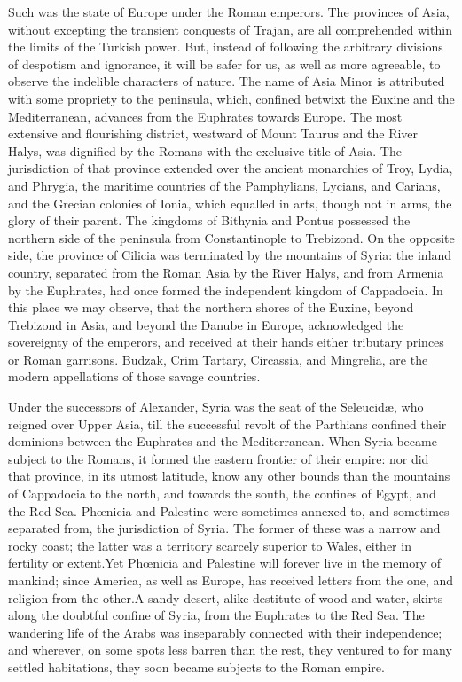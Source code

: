 Such was the state of Europe under the Roman emperors. The
provinces of Asia, without excepting the transient conquests of
Trajan, are all comprehended within the limits of the Turkish
power. But, instead of following the arbitrary divisions of
despotism and ignorance, it will be safer for us, as well as more
agreeable, to observe the indelible characters of nature. The
name of Asia Minor is attributed with some propriety to the
peninsula, which, confined betwixt the Euxine and the
Mediterranean, advances from the Euphrates towards Europe. The
most extensive and flourishing district, westward of Mount Taurus
and the River Halys, was dignified by the Romans with the
exclusive title of Asia. The jurisdiction of that province
extended over the ancient monarchies of Troy, Lydia, and Phrygia,
the maritime countries of the Pamphylians, Lycians, and Carians,
and the Grecian colonies of Ionia, which equalled in arts, though
not in arms, the glory of their parent. The kingdoms of Bithynia
and Pontus possessed the northern side of the peninsula from
Constantinople to Trebizond. On the opposite side, the province
of Cilicia was terminated by the mountains of Syria: the inland
country, separated from the Roman Asia by the River Halys, and
from Armenia by the Euphrates, had once formed the independent
kingdom of Cappadocia. In this place we may observe, that the
northern shores of the Euxine, beyond Trebizond in Asia, and
beyond the Danube in Europe, acknowledged the sovereignty of the
emperors, and received at their hands either tributary princes or
Roman garrisons. Budzak, Crim Tartary, Circassia, and Mingrelia,
are the modern appellations of those savage countries.\footnotemark[82]


Under the successors of Alexander, Syria was the seat of the
Seleucidæ, who reigned over Upper Asia, till the successful
revolt of the Parthians confined their dominions between the
Euphrates and the Mediterranean. When Syria became subject to the
Romans, it formed the eastern frontier of their empire: nor did
that province, in its utmost latitude, know any other bounds than
the mountains of Cappadocia to the north, and towards the south,
the confines of Egypt, and the Red Sea. Phœnicia and Palestine
were sometimes annexed to, and sometimes separated from, the
jurisdiction of Syria. The former of these was a narrow and rocky
coast; the latter was a territory scarcely superior to Wales,
either in fertility or extent.\footnotemark[821] Yet Phœnicia and Palestine
will forever live in the memory of mankind; since America, as
well as Europe, has received letters from the one, and religion
from the other.\footnotemark[83] A sandy desert, alike destitute of wood and
water, skirts along the doubtful confine of Syria, from the
Euphrates to the Red Sea. The wandering life of the Arabs was
inseparably connected with their independence; and wherever, on
some spots less barren than the rest, they ventured to for many
settled habitations, they soon became subjects to the Roman
empire.\footnotemark[84]

